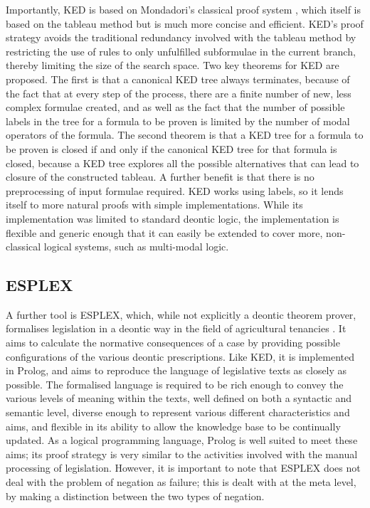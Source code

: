 \documentclass{l4proj}
\begin{document}
Importantly, KED is based on Mondadori's classical proof system \cite{Mondadori}, which itself is based on the tableau method but is much more concise and efficient. KED's proof strategy avoids the traditional redundancy involved with the tableau method by restricting the use of rules to only unfulfilled subformulae in the current branch, thereby limiting the size of the search space. Two key theorems for KED are proposed. The first is that a canonical KED tree always terminates, because of the fact that at every step of the process, there are a finite number of new, less complex formulae created, and as well as the fact that the number of possible labels in the tree for a formula to be proven is limited by the number of modal operators of the formula. The second theorem is that a KED tree for a formula to be proven is closed if and only if the canonical KED tree for that formula is closed, because a KED tree explores all the possible alternatives that can lead to closure of the constructed tableau. A further benefit is that there is no preprocessing of input formulae required. KED works using labels, so it lends itself to more natural proofs with simple implementations. While its implementation was limited to standard deontic logic, the implementation is flexible and generic enough that it can easily be extended to cover more, non-classical logical systems, such as multi-modal logic. 


\subsection{ESPLEX}
A further tool is ESPLEX, which, while not explicitly a deontic theorem prover, formalises legislation in a deontic way in the field of agricultural tenancies \cite{ESPLEX}. It aims to calculate the normative consequences of a case by providing possible configurations of the various deontic prescriptions. Like KED, it is implemented in Prolog, and aims to reproduce the language of legislative texts as closely as possible. The formalised language is required to be rich enough to convey the various levels of meaning within the texts, well defined on both a syntactic and semantic level, diverse enough to represent various different characteristics and aims, and flexible in its ability to allow the knowledge base to be continually updated. As a logical programming language, Prolog is well suited to meet these aims; its proof strategy is very similar to the activities involved with the manual processing of legislation. However, it is important to note that ESPLEX does not deal with the problem of negation as failure; this is dealt with at the meta level, by making a distinction between the two types of negation. 
\end{document}
